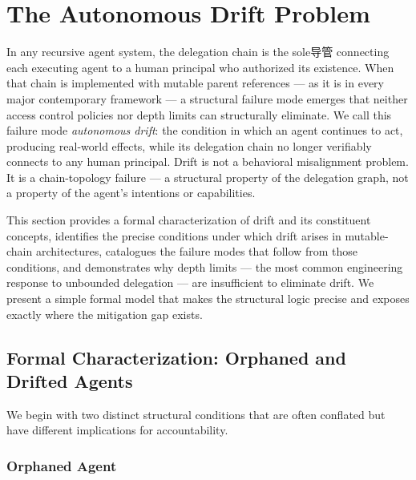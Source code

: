 \section{The Autonomous Drift Problem}
\label{sec:autonomous-drift-problem}

In any recursive agent system, the delegation chain is the sole导管 connecting each executing agent to a human principal who authorized its existence. When that chain is implemented with mutable parent references — as it is in every major contemporary framework — a structural failure mode emerges that neither access control policies nor depth limits can structurally eliminate. We call this failure mode \emph{autonomous drift}: the condition in which an agent continues to act, producing real-world effects, while its delegation chain no longer verifiably connects to any human principal. Drift is not a behavioral misalignment problem. It is a chain-topology failure — a structural property of the delegation graph, not a property of the agent's intentions or capabilities.

This section provides a formal characterization of drift and its constituent concepts, identifies the precise conditions under which drift arises in mutable-chain architectures, catalogues the failure modes that follow from those conditions, and demonstrates why depth limits — the most common engineering response to unbounded delegation — are insufficient to eliminate drift. We present a simple formal model that makes the structural logic precise and exposes exactly where the mitigation gap exists.

\subsection{Formal Characterization: Orphaned and Drifted Agents}
\label{sec:orphan-and-drift-definition}

We begin with two distinct structural conditions that are often conflated but have different implications for accountability.

\subsubsection{Orphaned Agent}
\label{sec:orphaned-agent}

